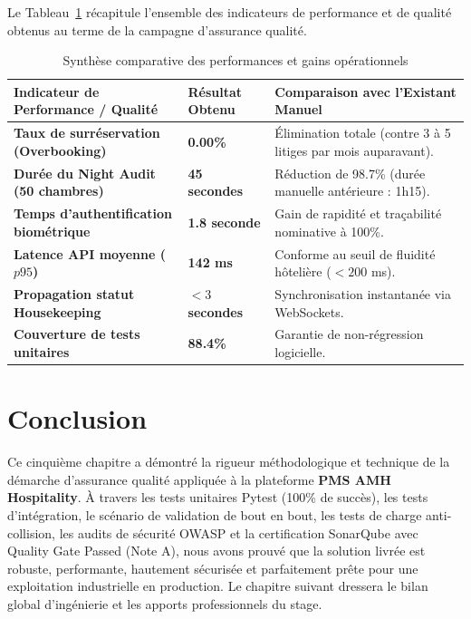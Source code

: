 \documentclass[12pt,a4paper,oneside]{report}
\begin{document}
Le Tableau~\ref{tab:bilan_tests_global} récapitule l'ensemble des indicateurs de performance et de qualité obtenus au terme de la campagne d'assurance qualité.

\begin{table}[H]
\centering
\small
\renewcommand{\arraystretch}{1.3}
\begin{tabularx}{\textwidth}{|p{4.5cm}|p{3.2cm}|X|}
\hline
\textbf{Indicateur de Performance / Qualité} & \textbf{Résultat Obtenu} & \textbf{Comparaison avec l'Existant Manuel} \\
\hline
\textbf{Taux de surréservation (Overbooking)} & \textbf{0.00\%} & Élimination totale (contre 3 à 5 litiges par mois auparavant). \\
\hline
\textbf{Durée du Night Audit (50 chambres)} & \textbf{45 secondes} & Réduction de 98.7\% (durée manuelle antérieure : 1h15). \\
\hline
\textbf{Temps d'authentification biométrique} & \textbf{1.8 seconde} & Gain de rapidité et traçabilité nominative à 100\%. \\
\hline
\textbf{Latence API moyenne ($p95$)} & \textbf{142 ms} & Conforme au seuil de fluidité hôtelière ($< 200$ ms). \\
\hline
\textbf{Propagation statut Housekeeping} & \textbf{$< 3$ secondes} & Synchronisation instantanée via WebSockets. \\
\hline
\textbf{Couverture de tests unitaires} & \textbf{88.4\%} & Garantie de non-régression logicielle. \\
\hline
\end{tabularx}
\caption{Synthèse comparative des performances et gains opérationnels}
\label{tab:bilan_tests_global}
\end{table}

\section{Conclusion}

Ce cinquième chapitre a démontré la rigueur méthodologique et technique de la démarche d'assurance qualité appliquée à la plateforme \textbf{PMS AMH Hospitality}. À travers les tests unitaires Pytest (100\% de succès), les tests d'intégration, le scénario de validation de bout en bout, les tests de charge anti-collision, les audits de sécurité OWASP et la certification SonarQube avec Quality Gate Passed (Note A), nous avons prouvé que la solution livrée est robuste, performante, hautement sécurisée et parfaitement prête pour une exploitation industrielle en production. Le chapitre suivant dressera le bilan global d'ingénierie et les apports professionnels du stage.
\end{document}

